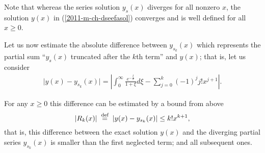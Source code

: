 Note that whereas the series solution $y_s(x)$ diverges for all nonzero $x$,
the solution $y(x)$ in (\ref{2011-m-ch-dseefasol})
converges and is well defined for all $x\ge 0$.

Let us now estimate the absolute difference between $y_{s_k}(x)$
which represents the partial sum ``$y_s(x)$ truncated
after the $k$th term'' and $y(x)$; that is, let us consider
\begin{equation}
\begin{split}
\vert y(x) - y_{s_k}(x) \vert=
\left\vert \int_0^\infty
\frac{e^{-\frac{\xi}{x}}}{1+\xi} d\xi
-
\sum_{j=0}^k (-1)^j j! x^{j+1} \right\vert .
\end{split}
\label{2011-m-ch-dseeanest}
\end{equation}

For any $x\ge 0$ this difference can be estimated \cite{rousseau-2004} by  a bound from above
\begin{equation}
\left| R_k(x)\right|
\stackrel{{\tiny \textrm{ def }}}{=}
\vert y(x) - y_{s_k}(x) \vert
\le
k! x^{k+1},
\label{2011-m-ch-dseeest}
\end{equation}
that is, this difference between the exact solution $y(x)$ and the diverging partial series
$y_{s_k}(x)$ is smaller than the first neglected term; and all subsequent ones.

